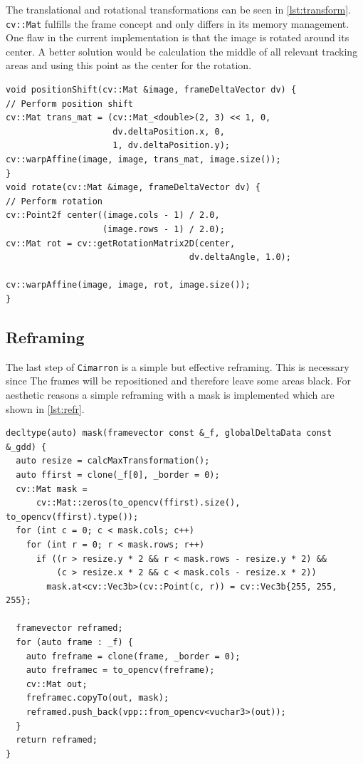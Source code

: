 The translational and rotational transformations can be seen in \cref{lst:transform}. \texttt{cv::Mat} fulfills the frame concept and only differs in its memory management. One flaw in the current implementation is that the image is rotated around its center. A better solution would be calculation the middle of all relevant tracking areas and using this point as the center for the rotation.

\begin{lstlisting}[caption={Frame transformations},label=lst:transform]
void positionShift(cv::Mat &image, frameDeltaVector dv) {
// Perform position shift
cv::Mat trans_mat = (cv::Mat_<double>(2, 3) << 1, 0,
                     dv.deltaPosition.x, 0,
                     1, dv.deltaPosition.y);
cv::warpAffine(image, image, trans_mat, image.size());
}
void rotate(cv::Mat &image, frameDeltaVector dv) {
// Perform rotation
cv::Point2f center((image.cols - 1) / 2.0,
                   (image.rows - 1) / 2.0);
cv::Mat rot = cv::getRotationMatrix2D(center,
                                    dv.deltaAngle, 1.0);

cv::warpAffine(image, image, rot, image.size());
}
\end{lstlisting}

\subsection{Reframing}
The last step of \texttt{Cimarron} is a simple but effective reframing. This is necessary since The frames will be repositioned and therefore leave some areas black. For aesthetic reasons a simple reframing with a mask is implemented which are shown in \cref{lst:refr}.

\begin{lstlisting}[caption={Frame transformations},label=lst:transform]
decltype(auto) mask(framevector const &_f, globalDeltaData const &_gdd) {
  auto resize = calcMaxTransformation();
  auto ffirst = clone(_f[0], _border = 0);
  cv::Mat mask =
      cv::Mat::zeros(to_opencv(ffirst).size(), to_opencv(ffirst).type());
  for (int c = 0; c < mask.cols; c++)
    for (int r = 0; r < mask.rows; r++)
      if ((r > resize.y * 2 && r < mask.rows - resize.y * 2) &&
          (c > resize.x * 2 && c < mask.cols - resize.x * 2))
        mask.at<cv::Vec3b>(cv::Point(c, r)) = cv::Vec3b{255, 255, 255};

  framevector reframed;
  for (auto frame : _f) {
    auto freframe = clone(frame, _border = 0);
    auto freframec = to_opencv(freframe);
    cv::Mat out;
    freframec.copyTo(out, mask);
    reframed.push_back(vpp::from_opencv<vuchar3>(out));
  }
  return reframed;
}
\end{lstlisting}

